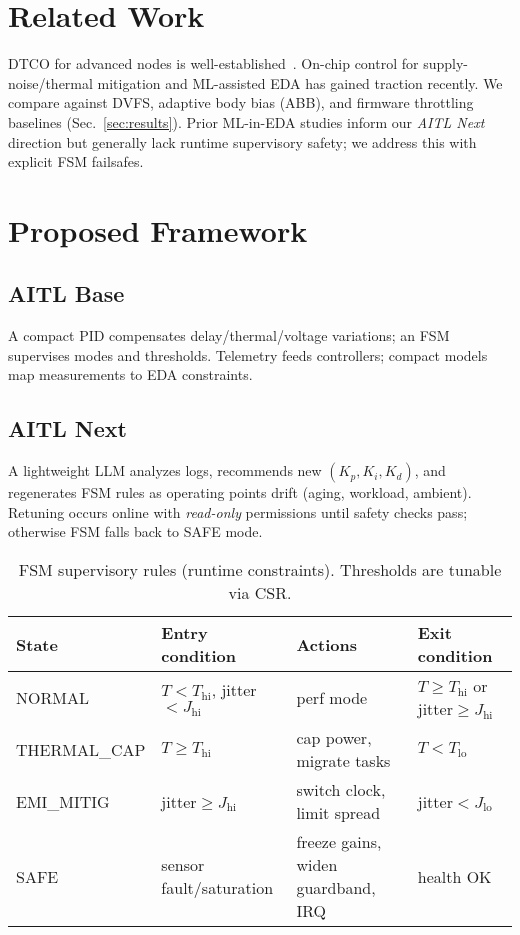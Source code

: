 \documentclass[conference]{IEEEtran}
\begin{document}
\section{Related Work}
DTCO for advanced nodes is well-established~\cite{yakimets,irds}. On-chip control for supply-noise/thermal mitigation and ML-assisted EDA has gained traction recently. We compare against DVFS, adaptive body bias (ABB), and firmware throttling baselines (Sec.~\ref{sec:results}). Prior ML-in-EDA studies inform our \emph{AITL Next} direction but generally lack runtime supervisory safety; we address this with explicit FSM failsafes.

\section{Proposed Framework}
\subsection{AITL Base}
A compact PID compensates delay/thermal/voltage variations; an FSM supervises modes and thresholds. Telemetry feeds controllers; compact models map measurements to EDA constraints.

\subsection{AITL Next}
A lightweight LLM analyzes logs, recommends new $(K_p,K_i,K_d)$, and regenerates FSM rules as operating points drift (aging, workload, ambient). Retuning occurs online with \emph{read-only} permissions until safety checks pass; otherwise FSM falls back to SAFE mode.

\begin{table}[t]
\centering
\caption{FSM supervisory rules (runtime constraints). Thresholds are tunable via CSR.}
\label{tab:fsm}
\begin{tabular}{@{}llll@{}}
\toprule
State & Entry condition & Actions & Exit condition \\
\midrule
NORMAL & $T<T_{\text{hi}}$, jitter$<J_{\text{hi}}$ &
perf mode & $T\ge T_{\text{hi}}$ or jitter$\ge J_{\text{hi}}$ \\
THERMAL\_CAP & $T\ge T_{\text{hi}}$ &
cap power, migrate tasks & $T<T_{\text{lo}}$ \\
EMI\_MITIG & jitter$\ge J_{\text{hi}}$ &
switch clock, limit spread & jitter$<J_{\text{lo}}$ \\
SAFE & sensor fault/saturation &
freeze gains, widen guardband, IRQ & health OK \\
\bottomrule
\end{tabular}
\end{table}
\end{document}
